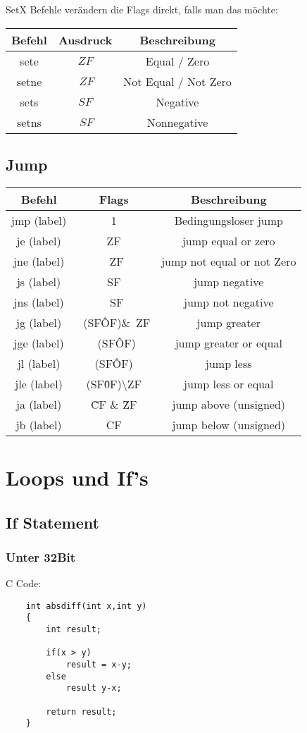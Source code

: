 \documentclass[a4paper, 11pt]{article}
\begin{document}
SetX Befehle verändern die Flags direkt, falls man das möchte:
\begin{tabular}{|c|c|c|}
	\hline
	Befehl & Ausdruck & Beschreibung\\\hline 
	sete & $ZF$ & Equal / Zero\\\hline 
	setne & $~ZF$ & Not Equal / Not Zero\\\hline 
	sets & $SF$ & Negative\\\hline 
	setns & $~SF$ & Nonnegative\\\hline  
\end{tabular}

\subsection{Jump}
\begin{tabular}{|c|c|c|}
	\hline
	Befehl & Flags & Beschreibung\\\hline
	jmp (label) & 1 & Bedingungsloser jump\\\hline
	je (label) & ZF & jump equal or zero \\\hline
	jne (label) & ~ZF & jump not equal or not Zero  \\\hline
	js (label) & SF & jump negative \\\hline
	jns (label) & ~SF & jump not negative  \\\hline
	jg (label) & ~(SF\^OF)\&~ZF & jump greater \\\hline
	jge (label) & ~(SF\^OF) & jump greater or equal \\\hline
	jl (label) & (SF\^OF)& jump less  \\\hline
	jle (label) & (SF\^0F)\textbackslash ZF & jump less or equal \\\hline
	ja (label) & \~CF \& \~ZF & jump above (unsigned) \\\hline
	jb (label) & CF & jump below (unsigned) \\\hline
\end{tabular}


\section{Loops und If's}

\subsection{If Statement}
\subsubsection{Unter 32Bit}
C Code:
\begin{lstlisting}
	int absdiff(int x,int y)
	{
		int result;
		
		if(x > y)
			result = x-y;
		else
			result y-x;
			
		return result;
	}
\end{lstlisting}
\end{document}
